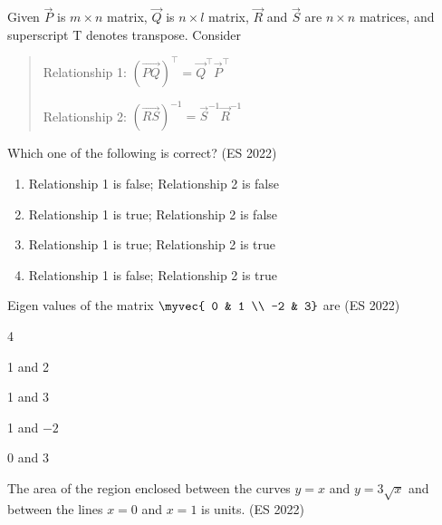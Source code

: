    \item Given $\vec{P}$ is $m \times n$ matrix, $\vec{Q}$ is $n \times l$ matrix, $\vec{R}$ and $\vec{S}$ are $n \times n$ matrices, and superscript T denotes transpose. Consider
         \begin{quote}
            Relationship 1: $(\vec{PQ})^{\top} = \vec{Q}^{\top}\vec{P}^{\top}$

            Relationship 2: $(\vec{RS})^{-1} = \vec{S}^{-1}\vec{R}^{-1}$
         \end{quote}
         Which one of the following is correct?
	 \hfill (ES 2022)
         \begin{enumerate}
            \item Relationship 1 is false; Relationship 2 is false
            \item Relationship 1 is true; Relationship 2 is false
            \item Relationship 1 is true; Relationship 2 is true
            \item Relationship 1 is false; Relationship 2 is true
         \end{enumerate}
   \item Eigen values of the matrix $\myvec{ 0 & 1 \\ -2 & 3}$ are
	 \hfill (ES 2022)
         \begin{enumerate}
\end{enumerate}
   \item The area of the region  enclosed between the curves $y = x$ and $y = 3\sqrt{x}$ and between the lines $x = 0$ and $x = 1$ is \underline{\hspace{2cm}} units.
	\hfill  (ES 2022)

